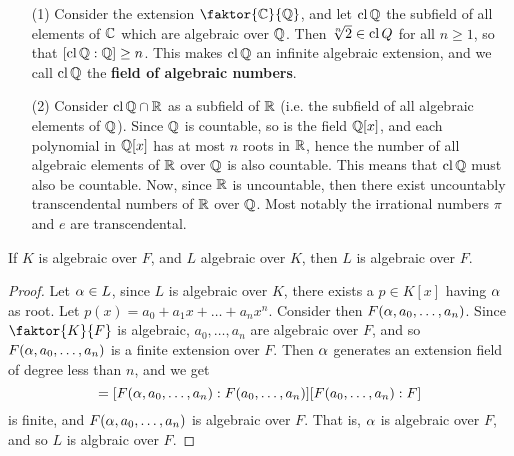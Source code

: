  \begin{example}\label{example_1.9}
     \begin{enumerate}
         \item[(1)] Consider the extension $\faktor{\C}{\Q}$, and let $\operatorname{cl}{\mathbb{Q}}$
             the subfield of all elements of $\mathbb{C}$ which are algebraic over
             $\mathbb{Q}$. Then $\sqrt[n]{2} \in \operatorname{cl}{Q}$ for all $n \geq 1$, so that
             $[\operatorname{cl}{\mathbb{Q}}:\mathbb{Q}] \geq n$. This makes $\operatorname{cl}{\mathbb{Q}}$ an infinite algebraic
             extension, and we call $\operatorname{cl}{\mathbb{Q}}$ the \textbf{field of algebraic
             numbers}.

         \item[(2)] Consider $\operatorname{cl}{\mathbb{Q}} \cap \mathbb{R}$ as a subfield of $\mathbb{R}$ (i.e. the
             subfield of all algebraic elements of $\mathbb{Q}$). Since  $\mathbb{Q}$ is
             countable, so is the field  $\mathbb{Q}[x]$, and each polynomial in $\mathbb{Q}[x]$
             has at most $n$ roots in  $\mathbb{R}$, hence the number of all algebraic
             elements of $\mathbb{R}$ over $\mathbb{Q}$ is also countable. This means that
             $\operatorname{cl}{\mathbb{Q}}$ must also be countable. Now, since $\mathbb{R}$ is uncountable,
             then there exist uncountably transcendental numbers of  $\mathbb{R}$ over
             $\mathbb{Q}$. Most notably the irrational numbers  $\pi$ and  $e$ are
             transcendental.
     \end{enumerate}
 \end{example}

 \begin{theorem}\label{1.2.7}
     If $K$ is algebraic over  $F$, and  $L$ algebraic over  $K$, then  $L$ is
     algebraic over  $F$.
 \end{theorem}
 \begin{proof}
     Let $\alpha \in L$, since  $L$ is algebraic over  $K$, there exists a  $p \in
     K[x]$ having $\alpha$ as root. Let $p(x)=a_0+a_1x+\dots+a_nx^n$. Consider then
     $F(\alpha,a_0, \dots, a_n)$. Since $\faktor{K}{F}$ is algebraic, $a_0, \dots,
     a_n$ are algebraic over $F$, and so  $F(\alpha, a_0, \dots, a_n)$ is a finite
     extension over $F$. Then $\alpha$ generates an extension field of degree less
     than $n$, and we get
     \begin{equation*}
         [F(\a, a_0, \dots, a_n):F]=
         [F(\a, a_0, \dots, a_n):F(a_0, \dots, a_n)][F(a_0, \dots,a_n):F]
     \end{equation*}
     is finite, and $F(\alpha,a_0, \dots, a_n)$ is algebraic over $F$. That is,
     $\alpha$ is algebraic over  $F$, and so  $L$ is algbraic over  $F$.
 \end{proof}


